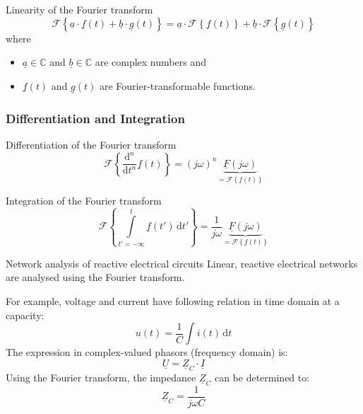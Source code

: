 \begin{refsection}
\begin{definition}{Linearity of the Fourier transform}
	\begin{equation}
		\mathcal{F}\left\{\underline{a} \cdot \underline{f}(t) + \underline{b} \cdot \underline{g}(t)\right\} = \underline{a} \cdot \mathcal{F}\left\{\underline{f}(t)\right\} + \underline{b} \cdot \mathcal{F}\left\{\underline{g}(t)\right\}
		\label{eq:ch02:op_lin}
	\end{equation}
	where
	\begin{itemize}
		\item $\underline{a} \in \mathbb{C}$ and $\underline{b} \in \mathbb{C}$ are complex numbers and
		\item $\underline{f}(t)$ and $\underline{g}(t)$ are Fourier-transformable functions.
	\end{itemize}
\end{definition}

\subsubsection{Differentiation and Integration}

\begin{definition}{Differentiation of the Fourier transform}
	\begin{equation}
		\mathcal{F}\left\{\frac{\mathrm{d}^n}{\mathrm{d} t^n} \underline{f}(t)\right\} = \left(j \omega\right)^n \underbrace{\underline{F} \left(j \omega\right)}_{= \mathcal{F}\left\{\underline{f}(t)\right\}}
		\label{eq:ch02:op_diff}
	\end{equation}
\end{definition}

\begin{definition}{Integration of the Fourier transform}
	\begin{equation}
		\mathcal{F}\left\{\int\limits_{t'= -\infty}^{t} \underline{f}(t') \, \mathrm{d} t' \right\} = \frac{1}{j \omega} \underbrace{\underline{F} \left(j \omega\right)}_{= \mathcal{F}\left\{\underline{f}(t)\right\}}
		\label{eq:ch02:op_int}
	\end{equation}
\end{definition}

\begin{excursus}{Network analysis of reactive electrical circuits}
	Linear, reactive electrical networks are analysed using the Fourier transform.
	
	For example, voltage and current have following relation in time domain at a capacity:
	\begin{equation}
		u(t) = \frac{1}{C} \int i(t) \, \mathrm{d} t
	\end{equation}
	The expression in complex-valued phasors (frequency domain) is:
	\begin{equation}
		\underline{U} = \underline{Z}_C \cdot \underline{I}
	\end{equation}
	Using the Fourier transform, the impedance $\underline{Z}_C$ can be determined to:
	\begin{equation}
		\underline{Z}_C = \frac{1}{j \omega C}
	\end{equation}
	

\end{excursus}
\end{refsection}

